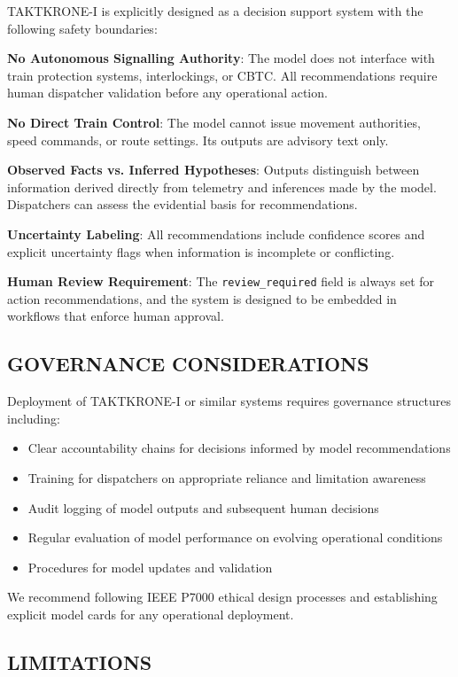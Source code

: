 \documentclass{IEEEoj}
\begin{document}
TAKTKRONE-I is explicitly designed as a decision support system with the following safety boundaries:

\textbf{No Autonomous Signalling Authority}: The model does not interface with train protection systems, interlockings, or CBTC. All recommendations require human dispatcher validation before any operational action.

\textbf{No Direct Train Control}: The model cannot issue movement authorities, speed commands, or route settings. Its outputs are advisory text only.

\textbf{Observed Facts vs. Inferred Hypotheses}: Outputs distinguish between information derived directly from telemetry and inferences made by the model. Dispatchers can assess the evidential basis for recommendations.

\textbf{Uncertainty Labeling}: All recommendations include confidence scores and explicit uncertainty flags when information is incomplete or conflicting.

\textbf{Human Review Requirement}: The \texttt{review\_required} field is always set for action recommendations, and the system is designed to be embedded in workflows that enforce human approval.

\subsection{GOVERNANCE CONSIDERATIONS}

Deployment of TAKTKRONE-I or similar systems requires governance structures including:
\begin{itemize}
    \item Clear accountability chains for decisions informed by model recommendations
    \item Training for dispatchers on appropriate reliance and limitation awareness
    \item Audit logging of model outputs and subsequent human decisions
    \item Regular evaluation of model performance on evolving operational conditions
    \item Procedures for model updates and validation
\end{itemize}

We recommend following IEEE P7000 \cite{ieee_p7000} ethical design processes and establishing explicit model cards \cite{mitchell2019model} for any operational deployment.

\subsection{LIMITATIONS}
\end{document}
